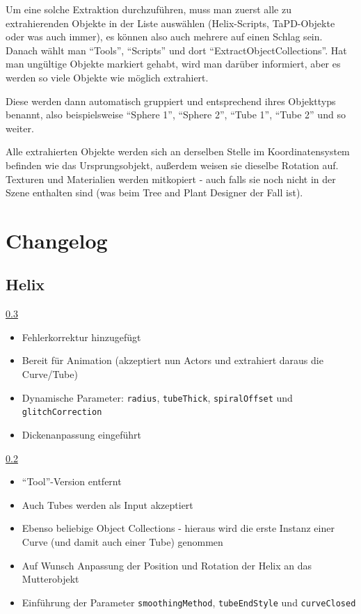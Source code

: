 \documentclass[12pt,a4paper]{scrartcl}
\begin{document}
Um eine solche Extraktion durchzuführen, muss man zuerst alle zu
extrahierenden Objekte in der Liste auswählen (Helix-Scripts,
TaPD-Objekte oder was auch immer), es können also auch mehrere auf
einen Schlag sein. Danach wählt man ``Tools'', ``Scripts'' und dort
``ExtractObjectCollections''. Hat man ungültige Objekte markiert gehabt,
wird man darüber informiert, aber es werden so viele Objekte wie
möglich extrahiert.

Diese werden dann automatisch gruppiert und entsprechend ihres
Objekttyps benannt, also beispielsweise ``Sphere 1'', ``Sphere 2'',
``Tube 1'', ``Tube 2'' und so weiter.

Alle extrahierten Objekte werden sich an derselben Stelle im Koordinatensystem
befinden wie das Ursprungsobjekt, außerdem weisen sie dieselbe Rotation
auf. Texturen und Materialien werden mitkopiert - auch falls sie noch nicht
in der Szene enthalten sind (was beim Tree and Plant Designer der Fall
ist).

\section{Changelog}
\subsection{Helix}
\underline{0.3}
\begin{itemize}
	\item Fehlerkorrektur hinzugefügt
	\item Bereit für Animation (akzeptiert nun Actors und extrahiert daraus
		die Curve/Tube)
	\item Dynamische Parameter: \texttt{radius}, \texttt{tubeThick},
		\texttt{spiralOffset} und \texttt{glitchCorrection}
	\item Dickenanpassung eingeführt
\end{itemize}
\underline{0.2}
\begin{itemize}
	\item ``Tool''-Version entfernt
	\item Auch Tubes werden als Input akzeptiert
	\item Ebenso beliebige Object Collections - hieraus wird die erste
		Instanz einer Curve (und damit auch einer Tube) genommen
	\item Auf Wunsch Anpassung der Position und Rotation der Helix
		an das Mutterobjekt
	\item Einführung der Parameter \texttt{smoothingMethod},
		\texttt{tubeEndStyle} und \texttt{curveClosed}
\end{itemize}
\end{document}
